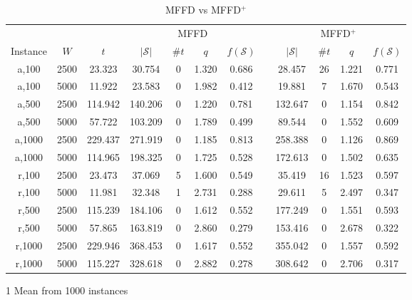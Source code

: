 \documentclass{elsarticle}
\begin{document}
\begin{table}[h!]
\centering
\caption{MFFD vs MFFD$^+$}
\begin{threeparttable}
\begin{tabular}{cccccccccccc}\toprule
	& & & \multicolumn{4}{c}{MFFD} &\phantom{a}& \multicolumn{4}{c}{MFFD$^+$}\\
	\cmidrule{4-7} \cmidrule{9-12}
	Instance & $W$ & $t$ & $|\mathcal{S}|$\tnote{1} & $\# t$ & $q$ & $f(\mathcal{S})$ && $|\mathcal{S}|$ & $\# t$ & $q$ & $f(\mathcal{S})$\\ \midrule	
	a,100 & 2500 & 23.323 & 30.754 & 0 & 1.320 & 0.686 && 28.457 & 26 & 1.221 & 0.771 \\
	a,100 & 5000 & 11.922 & 23.583 & 0 & 1.982 & 0.412 && 19.881 & 7 & 1.670 & 0.543  \\
	\midrule
	a,500 & 2500 & 114.942 & 140.206 & 0 & 1.220 & 0.781 && 132.647 & 0 & 1.154 & 0.842 \\
	a,500 & 5000 & 57.722 & 103.209 & 0 & 1.789 & 0.499 && 89.544 & 0 & 1.552 & 0.609 \\
	\midrule
	a,1000 & 2500 & 229.437 & 271.919 & 0 & 1.185 & 0.813 && 258.388 & 0 & 1.126 & 0.869 \\
	a,1000 & 5000 & 114.965 & 198.325 & 0 & 1.725 & 0.528 && 172.613 & 0 & 1.502 & 0.635 \\
	\midrule
	\midrule
	r,100 & 2500 & 23.473 & 37.069 & 5 & 1.600 & 0.549 && 35.419 & 16 & 1.523 & 0.597 \\
	r,100 & 5000 & 11.981 & 32.348 & 1 & 2.731 & 0.288 && 29.611 & 5 & 2.497 & 0.347 \\
	\midrule
	r,500 & 2500 & 115.239 & 184.106 & 0 & 1.612 & 0.552 && 177.249 & 0 & 1.551 & 0.593 \\
	r,500 & 5000 & 57.865 & 163.819 & 0 & 2.860 & 0.279 && 153.416 & 0 & 2.678 & 0.322 \\
	\midrule
	r,1000 & 2500 & 229.946 & 368.453 & 0 & 1.617 & 0.552 && 355.042 & 0 & 1.557 & 0.592 \\
	r,1000 & 5000 & 115.227 & 328.618 & 0 & 2.882 & 0.278 && 308.642 & 0 & 2.706 & 0.317 \\
	\bottomrule
\end{tabular}
\begin{tablenotes}
	\item[1] Mean from 1000 instances
\end{tablenotes}	
\end{threeparttable}	
\label{table:MFFD}
\end{table}
\end{document}
